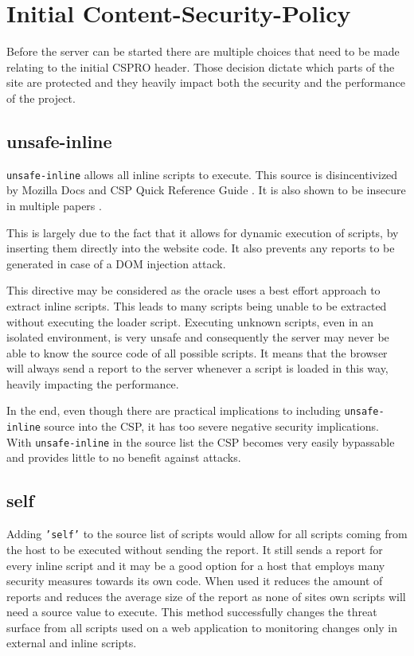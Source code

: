\section{Initial Content-Security-Policy}
Before the server can be started there are multiple choices that need to be made relating to the initial CSPRO header.
Those decision dictate which parts of the site are protected and they heavily impact both the security and the performance of the project.

\subsection{unsafe-inline}

\texttt{unsafe-inline} allows all inline scripts to execute. 
This source is disincentivized by Mozilla Docs \cite{unsafeinlinebad2} and CSP Quick Reference Guide \cite{unsafeinlinebad1}.
It is also shown to be insecure in multiple papers \cite{weichselbaum2016csp} \cite{osti_10173479}.

This is largely due to the fact that it allows for dynamic execution of scripts, by inserting them directly into the website code.
It also prevents any reports to be generated in case of a DOM injection attack.

This directive may be considered as the oracle uses a best effort approach to extract inline scripts.
This leads to many scripts being unable to be extracted without executing the loader script.
Executing unknown scripts, even in an isolated environment, is very unsafe and consequently the server may never be able to know the source code of all possible scripts.
It means that the browser will always send a report to the server whenever a script is loaded in this way, heavily impacting the performance.

In the end, even though there are practical implications to including \texttt{unsafe-inline} source into the CSP, it has too severe negative security implications.
With \texttt{unsafe-inline} in the source list the CSP becomes very easily bypassable and provides little to no benefit against attacks.

\subsection{self}

Adding \texttt{'self'} to the source list of scripts would allow for all scripts coming from the host to be executed without sending the report.
It still sends a report for every inline script and it  may be a good option for a host that employs many security measures towards its own code.
When used it reduces the amount of reports and reduces the average size of the report as none of sites own scripts will need a source value to execute.
This method successfully changes the threat surface from all scripts used on a web application to monitoring changes only in external and inline scripts.

